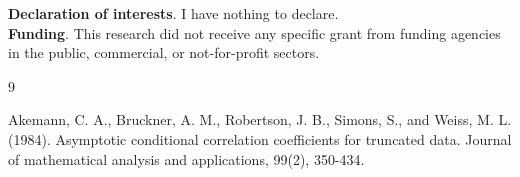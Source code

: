 \documentclass[sn-mathphys,Numbered,11pt]{sn-jnl}%
\theoremstyle{thmstyleone}%
\begin{document}
\textbf{Declaration of interests}. I have nothing to declare.\\
\textbf{Funding}. This research did not receive any specific grant from funding agencies in the public, commercial, or not-for-profit sectors.



\begin{thebibliography}{9} 


 Akemann, C. A., Bruckner, A. M., Robertson, J. B., Simons, S., and Weiss, M. L. (1984). Asymptotic conditional correlation coefficients for truncated data. Journal of mathematical analysis and applications, 99(2), 350-434.


\end{thebibliography}
\end{document}
